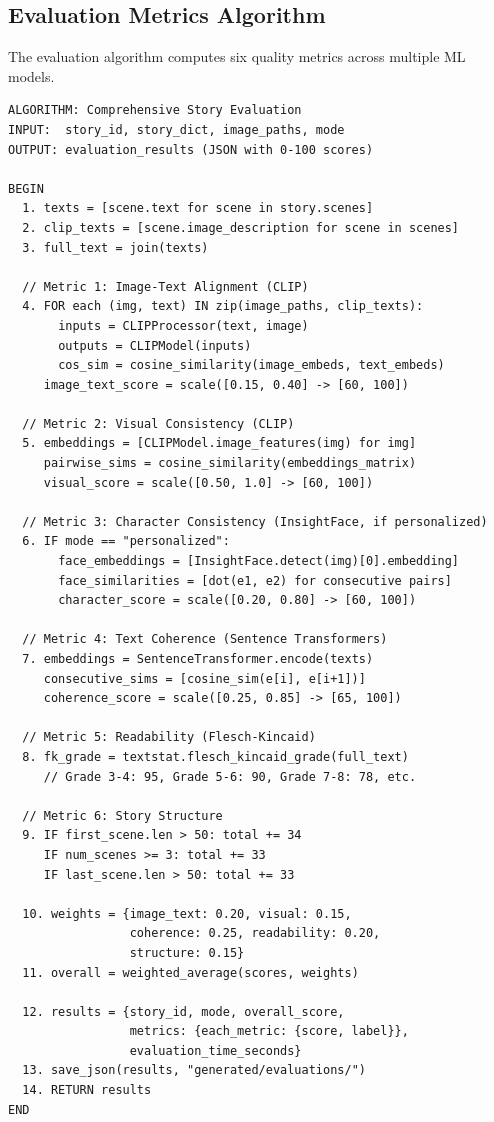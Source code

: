 \subsection{Evaluation Metrics Algorithm}

The evaluation algorithm computes six quality metrics across multiple ML models.

\begin{verbatim}
ALGORITHM: Comprehensive Story Evaluation
INPUT:  story_id, story_dict, image_paths, mode
OUTPUT: evaluation_results (JSON with 0-100 scores)

BEGIN
  1. texts = [scene.text for scene in story.scenes]
  2. clip_texts = [scene.image_description for scene in scenes]
  3. full_text = join(texts)

  // Metric 1: Image-Text Alignment (CLIP)
  4. FOR each (img, text) IN zip(image_paths, clip_texts):
       inputs = CLIPProcessor(text, image)
       outputs = CLIPModel(inputs)
       cos_sim = cosine_similarity(image_embeds, text_embeds)
     image_text_score = scale([0.15, 0.40] -> [60, 100])

  // Metric 2: Visual Consistency (CLIP)
  5. embeddings = [CLIPModel.image_features(img) for img]
     pairwise_sims = cosine_similarity(embeddings_matrix)
     visual_score = scale([0.50, 1.0] -> [60, 100])

  // Metric 3: Character Consistency (InsightFace, if personalized)
  6. IF mode == "personalized":
       face_embeddings = [InsightFace.detect(img)[0].embedding]
       face_similarities = [dot(e1, e2) for consecutive pairs]
       character_score = scale([0.20, 0.80] -> [60, 100])

  // Metric 4: Text Coherence (Sentence Transformers)
  7. embeddings = SentenceTransformer.encode(texts)
     consecutive_sims = [cosine_sim(e[i], e[i+1])]
     coherence_score = scale([0.25, 0.85] -> [65, 100])

  // Metric 5: Readability (Flesch-Kincaid)
  8. fk_grade = textstat.flesch_kincaid_grade(full_text)
     // Grade 3-4: 95, Grade 5-6: 90, Grade 7-8: 78, etc.

  // Metric 6: Story Structure
  9. IF first_scene.len > 50: total += 34
     IF num_scenes >= 3: total += 33
     IF last_scene.len > 50: total += 33

  10. weights = {image_text: 0.20, visual: 0.15,
                 coherence: 0.25, readability: 0.20,
                 structure: 0.15}
  11. overall = weighted_average(scores, weights)

  12. results = {story_id, mode, overall_score,
                 metrics: {each_metric: {score, label}},
                 evaluation_time_seconds}
  13. save_json(results, "generated/evaluations/")
  14. RETURN results
END
\end{verbatim}

